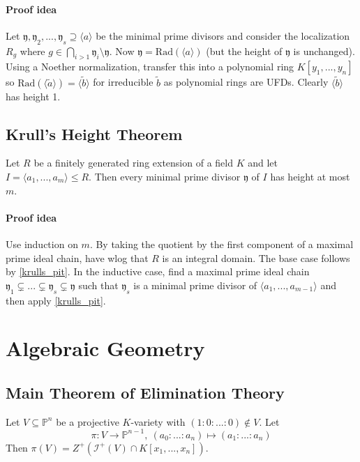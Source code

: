 \documentclass{scrartcl}
\begin{document}
\paragraph{Proof idea} 
Let $\mathfrak{y}, \mathfrak{y}_2, ..., \mathfrak{y}_s \supseteq \langle a \rangle$ be the minimal prime divisors and consider the localization $R_g$ where $g \in \bigcap_{i > 1} \mathfrak{y}_i \setminus \mathfrak{y}$.
Now $\mathfrak{y} = \mathrm{Rad}(\langle a \rangle)$ (but the height of $\mathfrak{y}$ is unchanged).
Using a Noether normalization, transfer this into a polynomial ring $K[y_1, ..., y_n]$ so $\mathrm{Rad}(\langle \tilde{a} \rangle) = \langle \tilde{b} \rangle$ for irreducible $\tilde{b}$ as polynomial rings are UFDs.
Clearly $\langle \tilde{b} \rangle$ has height 1.

\subsection{Krull's Height Theorem}
Let $R$ be a finitely generated ring extension of a field $K$ and let $I = \langle a_1, ..., a_m \rangle \leq R$.
Then every minimal prime divisor $\mathfrak{y}$ of $I$ has height at most $m$.
\paragraph{Proof idea} Use induction on $m$. 
By taking the quotient by the first component of a maximal prime ideal chain, have wlog that $R$ is an integral domain.
The base case follows by \ref{krulls_pit}. 
In the inductive case, find a maximal prime ideal chain $\mathfrak{y}_1 \subsetneq ... \subsetneq \mathfrak{y}_s \subsetneq \mathfrak{y}$ such that $\mathfrak{y}_s$ is a minimal prime divisor of $\langle a_1, ..., a_{m - 1} \rangle$ and then apply \ref{krulls_pit}.

\section{Algebraic Geometry}

\subsection{Main Theorem of Elimination Theory}
Let $V \subseteq \mathbb{P}^n$ be a projective $K$-variety with $(1 : 0 : ... : 0) \notin V$.
Let
\begin{equation*}
    \pi: V \to \mathbb{P}^{n - 1}, \ (a_0 : ... : a_n) \mapsto (a_1 : ... : a_n)
\end{equation*}
Then $\pi(V) = Z^+(\mathcal{I}^+(V) \cap K[x_1, ..., x_n])$.
\end{document}
